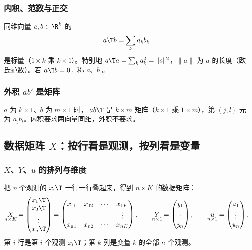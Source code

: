 \subsubsection{内积、范数与正交}

同维向量 $a,b\in\R^k$ 的
\[
a\T b=\sum_{k} a_kb_k
\]
是标量（$1\times k$ 乘 $k\times1$）。特别地 $a\T a=\sum_k a_k^2=\|a\|^2$，$\|a\|$ 为 $a$ 的长度（欧氏范数）。若 $a\T b=0$，称 $a$、$b$ 。

\subsubsection{外积 \texorpdfstring{$ab'$}{ab'} 是矩阵}

$a$ 为 $k\times1$、$b$ 为 $m\times1$ 时， $ab\T$ 是 $k\times m$ 矩阵（$k\times1$ 乘 $1\times m$），第 $(j,l)$ 元为 $a_jb_l$。内积要求两向量同维，外积不要求。

\subsection{数据矩阵 \texorpdfstring{$X$}{X}：按行看是观测，按列看是变量}

\subsubsection{\texorpdfstring{$X$、$Y$、$u$}{X, Y, u} 的排列与维度}

把 $n$ 个观测的 $x_i\T$ 一行一行叠起来，得到 $n\times K$ 的数据矩阵：
\[
\underset{n\times K}{X}=\begin{pmatrix}x_1\T\\x_2\T\\\vdots\\x_n\T\end{pmatrix}
=\begin{pmatrix}x_{11}&x_{12}&\cdots&x_{1K}\\\vdots&&&\vdots\\x_{n1}&x_{n2}&\cdots&x_{nK}\end{pmatrix},\qquad
\underset{n\times 1}{Y}=\begin{pmatrix}y_1\\\vdots\\y_n\end{pmatrix},\qquad
\underset{n\times 1}{u}=\begin{pmatrix}u_1\\\vdots\\u_n\end{pmatrix}.
\]
第 $i$ 行是第 $i$ 个观测 $x_i\T$；第 $k$ 列是变量 $k$ 的全部 $n$ 个观测。

